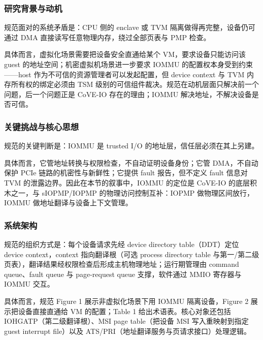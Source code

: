 \documentclass[11pt]{ctexart}
\begin{document}
\subsubsection{研究背景与动机}
规范面对的系统矛盾是：CPU 侧的 enclave 或 TVM 隔离做得再完整，设备仍可通过 DMA 直接读写任意物理内存，绕过全部页表与 PMP 检查。\par
具体而言，虚拟化场景需要把设备安全直通给某个 VM，要求设备只能访问该 guest 的地址空间；机密虚拟机场景进一步要求 IOMMU 的配置权本身受到约束——host 作为不可信的资源管理者可以发起配置，但 device context 与 TVM 内存所有权的绑定必须由 TSM 级别的可信组件裁决。规范在动机层面只解决前一个问题，后一个问题正是 CoVE-IO 存在的理由；IOMMU 解决地址，不解决设备是否可信。\par
\subsubsection{关键挑战与核心思想}
规范的关键判断是：IOMMU 是 trusted I/O 的地址层，信任层必须在其上另建。\par
具体而言，它管地址转换与权限检查，不自动证明设备身份；它管 DMA，不自动保护 PCIe 链路的机密性与新鲜性；它提供 fault 报告，但不定义 fault 信息对 TVM 的泄露边界。因此在本节的叙事中，IOMMU 的定位是 CoVE-IO 的底层积木之一，与 sIOPMP/IOPMP 的物理访问控制互补：IOPMP 做物理区间放行，IOMMU 做地址翻译与设备上下文管理。\par
\subsubsection{系统架构}
规范的组织方式是：每个设备请求先经 device directory table（DDT）定位 device context，context 指向翻译根（可选 process directory table 与第一/第二级页表），翻译结果经权限检查后形成主机物理地址；运行期管理由 command queue、fault queue 与 page-request queue 支撑，软件通过 MMIO 寄存器与 IOMMU 交互。\par
具体而言，规范 Figure 1 展示非虚拟化场景下用 IOMMU 隔离设备，Figure 2 展示把设备直接直通给 VM 的配置；Table 1 给出术语表。核心对象还包括 IOHGATP（第二级翻译根）、MSI page table（把设备 MSI 写入重映射到指定 guest interrupt file）以及 ATS/PRI（地址翻译服务与页请求接口）处理逻辑。\par
\end{document}

